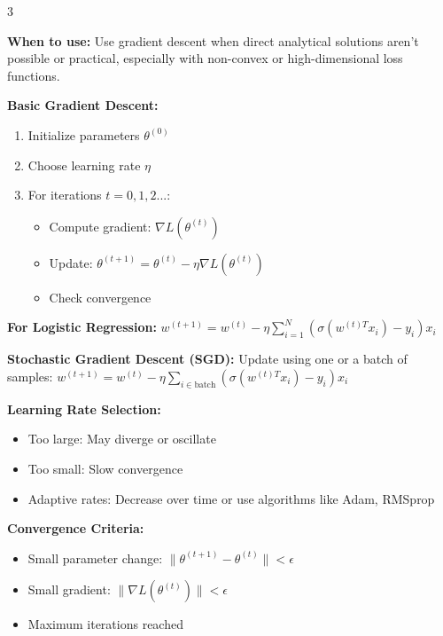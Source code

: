 \documentclass[10pt,landscape]{article}
\begin{document}
\begin{multicols}{3}
\begin{tcolorbox}[breakable, title=2.4 Gradient Descent Implementation, colback=classification,boxsep=1pt,left=1pt,right=1pt,top=1pt,bottom=1pt]
\textbf{When to use:} Use gradient descent when direct analytical solutions aren't possible or practical, especially with non-convex or high-dimensional loss functions.

\textbf{Basic Gradient Descent:}
\begin{enumerate}[leftmargin=*,noitemsep,topsep=0pt]
    \item Initialize parameters $\theta^{(0)}$
    \item Choose learning rate $\eta$
    \item For iterations $t=0,1,2...$:
    \begin{itemize}[leftmargin=*,noitemsep]
        \item Compute gradient: $\nabla L(\theta^{(t)})$
        \item Update: $\theta^{(t+1)} = \theta^{(t)} - \eta \nabla L(\theta^{(t)})$
        \item Check convergence
    \end{itemize}
\end{enumerate}

\textbf{For Logistic Regression:}
$w^{(t+1)} = w^{(t)} - \eta \sum_{i=1}^{N}(\sigma(w^{(t)T}x_i) - y_i)x_i$

\textbf{Stochastic Gradient Descent (SGD):}
Update using one or a batch of samples:
$w^{(t+1)} = w^{(t)} - \eta \sum_{i \in \text{batch}}(\sigma(w^{(t)T}x_i) - y_i)x_i$

\textbf{Learning Rate Selection:}
\begin{itemize}[leftmargin=*,noitemsep,topsep=0pt]
    \item Too large: May diverge or oscillate
    \item Too small: Slow convergence
    \item Adaptive rates: Decrease over time or use algorithms like Adam, RMSprop
\end{itemize}

\textbf{Convergence Criteria:}
\begin{itemize}[leftmargin=*,noitemsep,topsep=0pt]
    \item Small parameter change: $\|\theta^{(t+1)} - \theta^{(t)}\| < \epsilon$
    \item Small gradient: $\|\nabla L(\theta^{(t)})\| < \epsilon$
    \item Maximum iterations reached
\end{itemize}
\end{tcolorbox}


\end{multicols}
\end{document}
